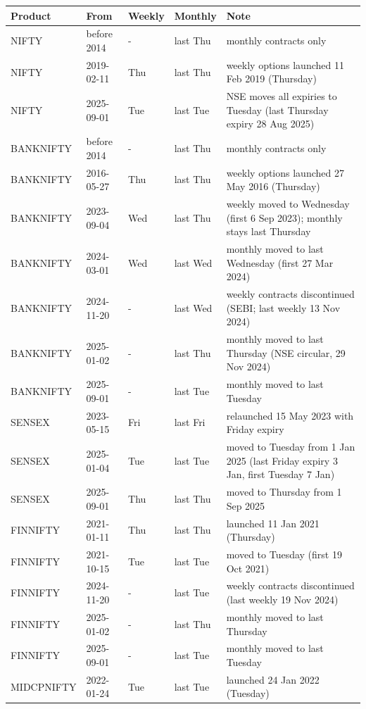 \begin{tabular}{llllp{6.2cm}}
\toprule
Product & From & Weekly & Monthly & Note \\
\midrule
NIFTY & before 2014 & - & last Thu & monthly contracts only \\
NIFTY & 2019-02-11 & Thu & last Thu & weekly options launched 11 Feb 2019 (Thursday) \\
NIFTY & 2025-09-01 & Tue & last Tue & NSE moves all expiries to Tuesday (last Thursday expiry 28 Aug 2025) \\
BANKNIFTY & before 2014 & - & last Thu & monthly contracts only \\
BANKNIFTY & 2016-05-27 & Thu & last Thu & weekly options launched 27 May 2016 (Thursday) \\
BANKNIFTY & 2023-09-04 & Wed & last Thu & weekly moved to Wednesday (first 6 Sep 2023); monthly stays last Thursday \\
BANKNIFTY & 2024-03-01 & Wed & last Wed & monthly moved to last Wednesday (first 27 Mar 2024) \\
BANKNIFTY & 2024-11-20 & - & last Wed & weekly contracts discontinued (SEBI; last weekly 13 Nov 2024) \\
BANKNIFTY & 2025-01-02 & - & last Thu & monthly moved to last Thursday (NSE circular, 29 Nov 2024) \\
BANKNIFTY & 2025-09-01 & - & last Tue & monthly moved to last Tuesday \\
SENSEX & 2023-05-15 & Fri & last Fri & relaunched 15 May 2023 with Friday expiry \\
SENSEX & 2025-01-04 & Tue & last Tue & moved to Tuesday from 1 Jan 2025 (last Friday expiry 3 Jan, first Tuesday 7 Jan) \\
SENSEX & 2025-09-01 & Thu & last Thu & moved to Thursday from 1 Sep 2025 \\
FINNIFTY & 2021-01-11 & Thu & last Thu & launched 11 Jan 2021 (Thursday) \\
FINNIFTY & 2021-10-15 & Tue & last Tue & moved to Tuesday (first 19 Oct 2021) \\
FINNIFTY & 2024-11-20 & - & last Tue & weekly contracts discontinued (last weekly 19 Nov 2024) \\
FINNIFTY & 2025-01-02 & - & last Thu & monthly moved to last Thursday \\
FINNIFTY & 2025-09-01 & - & last Tue & monthly moved to last Tuesday \\
MIDCPNIFTY & 2022-01-24 & Tue & last Tue & launched 24 Jan 2022 (Tuesday) \\

\end{tabular}
